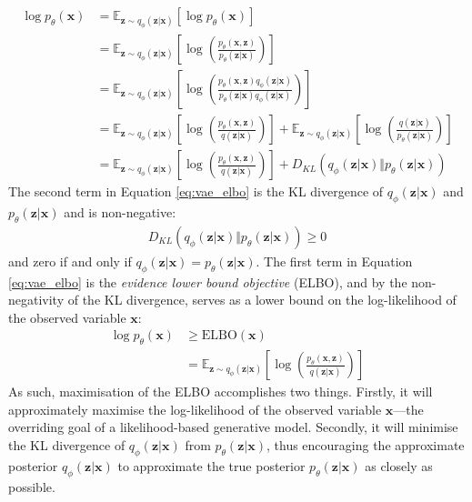 \documentclass[ oneside,%
                    author={George Herbert},
                    degree={MSci},
                     title={Video Diffusion Models for Climate Simulations},
                  subtitle={}]{dissertation}
\begin{document}
\begin{align}
      \log p_\theta(\mathbf{x})&=\mathbb{E}_{\mathbf{z}\sim q_\phi(\mathbf{z}|\mathbf{x})}\left[\log p_\theta(\mathbf{x})\right]\\
      &=\mathbb{E}_{\mathbf{z}\sim q_\phi(\mathbf{z}|\mathbf{x})}\left[\log\left(\frac{p_\theta(\mathbf{x},\mathbf{z})}{p_\theta(\mathbf{z}|\mathbf{x})}\right)\right]\\
      &=\mathbb{E}_{\mathbf{z}\sim q_\phi(\mathbf{z}|\mathbf{x})}\left[\log\left(\frac{p_\theta(\mathbf{x},\mathbf{z})q_\phi(\mathbf{z}|\mathbf{x})}{p_\theta(\mathbf{z}|\mathbf{x})q_\phi(\mathbf{z}|\mathbf{x})}\right)\right]\\
      &=\mathbb{E}_{\mathbf{z}\sim q_\phi(\mathbf{z}|\mathbf{x})}\left[\log\left(\frac{p_\theta(\mathbf{x},\mathbf{z})}{q(\mathbf{z}|\mathbf{x})}\right)\right]+\mathbb{E}_{\mathbf{z}\sim q_\phi(\mathbf{z}|\mathbf{x})}\left[\log\left(\frac{q(\mathbf{z}|\mathbf{x})}{p_\theta(\mathbf{z}|\mathbf{x})}\right)\right]\\
      &=\mathbb{E}_{\mathbf{z}\sim q_\phi(\mathbf{z}|\mathbf{x})}\left[\log\left(\frac{p_\theta(\mathbf{x},\mathbf{z})}{q(\mathbf{z}|\mathbf{x})}\right)\right]+D_{KL}(q_\phi(\mathbf{z}|\mathbf{x})\Vert p_\theta(\mathbf{z}|\mathbf{x}))
      \label{eq:vae_elbo}
\end{align}
The second term in Equation \ref{eq:vae_elbo} is the KL divergence of $q_\phi(\mathbf{z}|\mathbf{x})$ and $p_\theta(\mathbf{z}|\mathbf{x})$ and is non-negative:
\begin{align}
      D_{KL}(q_\phi(\mathbf{z}|\mathbf{x})\Vert p_\theta(\mathbf{z}|\mathbf{x}))\ge 0
\end{align}
and zero if and only if $q_\phi(\mathbf{z}|\mathbf{x})=p_\theta(\mathbf{z}|\mathbf{x})$. The first term in Equation \ref{eq:vae_elbo} is the \textit{evidence lower bound objective} (ELBO), and by the non-negativity of the KL divergence, serves as a lower bound on the log-likelihood of the observed variable $\mathbf{x}$:
\begin{align}
      \log p_\theta(\mathbf{x})&\ge \mathrm{ELBO}(\mathbf{x})\\
      &=\mathbb{E}_{\mathbf{z}\sim q_\phi(\mathbf{z}|\mathbf{x})}\left[\log\left(\frac{p_\theta(\mathbf{x},\mathbf{z})}{q(\mathbf{z}|\mathbf{x})}\right)\right]
\end{align}
As such, maximisation of the ELBO accomplishes two things. Firstly, it will approximately maximise the log-likelihood of the observed variable $\mathbf{x}$---the overriding goal of a likelihood-based generative model. Secondly, it will minimise the KL divergence of $q_\phi(\mathbf{z}|\mathbf{x})$ from $p_\theta(\mathbf{z}|\mathbf{x})$, thus encouraging the approximate posterior $q_\phi(\mathbf{z}|\mathbf{x})$ to approximate the true posterior $p_\theta(\mathbf{z}|\mathbf{x})$ as closely as possible. 
\end{document}
